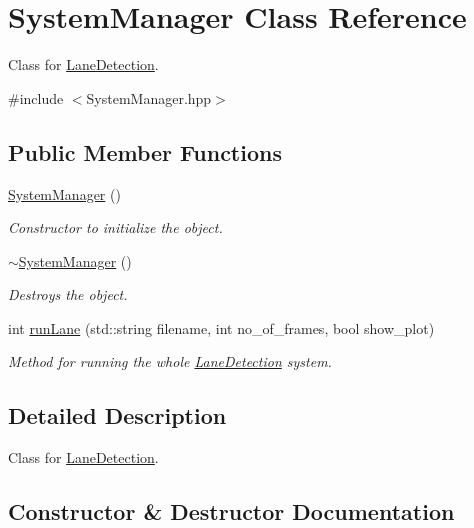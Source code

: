 \hypertarget{class_system_manager}{}\section{System\+Manager Class Reference}
\label{class_system_manager}


Class for \hyperlink{class_lane_detection}{Lane\+Detection}.  




{\ttfamily \#include $<$System\+Manager.\+hpp$>$}

\subsection*{Public Member Functions}
\begin{DoxyCompactItemize}
\item 
\hyperlink{class_system_manager_a2f8a3e2e1929be50ef8702629f50bb94}{System\+Manager} ()
\begin{DoxyCompactList}\small\item\em Constructor to initialize the object. \end{DoxyCompactList}\item 
\hyperlink{class_system_manager_a0fa2e3c0906401494f6bf4e482aecc0d}{$\sim$\+System\+Manager} ()\hypertarget{class_system_manager_a0fa2e3c0906401494f6bf4e482aecc0d}{}\label{class_system_manager_a0fa2e3c0906401494f6bf4e482aecc0d}

\begin{DoxyCompactList}\small\item\em Destroys the object. \end{DoxyCompactList}\item 
int \hyperlink{class_system_manager_ae189ebfcc72d8fb1e67ddf7215bdc77a}{run\+Lane} (std\+::string filename, int no\+\_\+of\+\_\+frames, bool show\+\_\+plot)
\begin{DoxyCompactList}\small\item\em Method for running the whole \hyperlink{class_lane_detection}{Lane\+Detection} system. \end{DoxyCompactList}\end{DoxyCompactItemize}


\subsection{Detailed Description}
Class for \hyperlink{class_lane_detection}{Lane\+Detection}. 

\subsection{Constructor \& Destructor Documentation}
